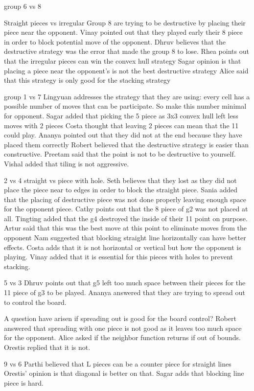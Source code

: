 group 6 vs 8

Straight pieces vs irregular
Group 8 are trying to be destructive by placing their piece near the opponent.
Vinay pointed out that they played early their 8 piece in order to block potential
move of the opponent.
Dhruv believes that the destructive strategy was the error that made the group 8 to lose.
Rhea points out that the irregular pieces can win the convex hull strategy
Sagar opinion is that placing a piece near the opponent’s is not the best destructive strategy
Alice said that this strategy is only good for the stacking strategy


group 1 vs 7
Lingyuan addresses the strategy that they are using: every cell has a possible number of moves that can be participate. So make this number minimal for opponent.
Sagar added that picking the 5 piece as 3x3 convex hull left less moves with 2 pieces
Costa thought that leaving 2 pieces can mean that the 11 could play.
Ananya pointed out that they did not at the end because they have placed them correctly
Robert believed that the destructive strategy is easier than constructive.
Preetam said that the point is not to be destructive to yourself.
Vishal added that tiling is not aggressive.

2 vs 4
straight vs piece with hole.
Seth believes that they lost as they did not place the piece near to edges in order to block the straight piece.
Sania added that the placing of destructive piece was not done properly leaving enough space for the opponent piece.
Cathy points out that the 8 piece of g2 was not placed at all.
Tingting added that the g4 destroyed the inside of their 11 point on purpose.
Artur said that this was the best move at this point to eliminate moves from the opponent
Nam suggested that blocking straight line horizontally can have better effects.
Costa adds that it is not horizontal or vertical but how the opponent is playing.
Vinay added that it is essential for this pieces with holes to prevent stacking.

5 vs 3
Dhruv points out that g5 left too much space between their pieces for the 11 piece of g3 to be played.
Ananya answered that they are trying to spread out to control the board.

A question have arisen if spreading out is good for the board control?
Robert answered that spreading with one piece is not good as it leaves too much space for the opponent.
Alice asked if the neighbor function returns if out of bounds. Orestis replied that it is not.

9 vs 6 
Parthi believed that L pieces can be a counter piece for straight lines
Orestis’ opinion is that diagonal is better on that.
Sagar adds that blocking line piece is hard.

